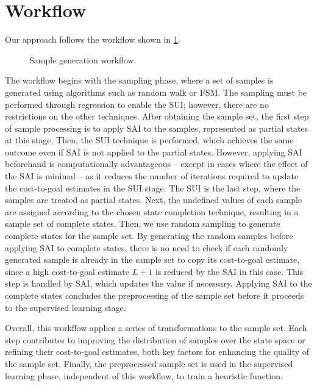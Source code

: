 \section{Workflow}
\label{sec:workflow}

Our approach follows the workflow shown in \cref{fig:workflow}.

\begin{figure}[tb]
    \caption{Sample generation workflow.}
    \label{fig:workflow}
    \addmargin
    \centering
    
\end{figure}

The workflow begins with the sampling phase, where a set of samples is generated using algorithms such as random walk or FSM. The sampling must be performed through regression to enable the SUI; however, there are no restrictions on the other techniques.
After obtaining the sample set, the first step of sample processing is to apply SAI to the samples, represented as partial states at this stage. Then, the SUI technique is performed, which achieves the same outcome even if SAI is not applied to the partial states. However, applying SAI beforehand is computationally advantageous -- except in cases where the effect of the SAI is minimal -- as it reduces the number of iterations required to update the cost-to-goal estimates in the SUI stage.
The SUI is the last step, where the samples are treated as partial states. Next, the undefined values of each sample are assigned according to the chosen state completion technique, resulting in a sample set of complete states.
Then, we use random sampling to generate complete states for the sample set. By generating the random samples before applying SAI to complete states, there is no need to check if each randomly generated sample is already in the sample set to copy its cost-to-goal estimate, since a high cost-to-goal estimate $L+1$ is reduced by the SAI in this case. This step is handled by SAI, which updates the value if necessary. Applying SAI to the complete states concludes the preprocessing of the sample set before it proceeds to the supervised learning stage.

Overall, this workflow applies a series of transformations to the sample set. Each step contributes to improving the distribution of samples over the state space or refining their cost-to-goal estimates, both key factors for enhancing the quality of the sample set. Finally, the preprocessed sample set is used in the supervised learning phase, independent of this workflow, to train a heuristic function.

